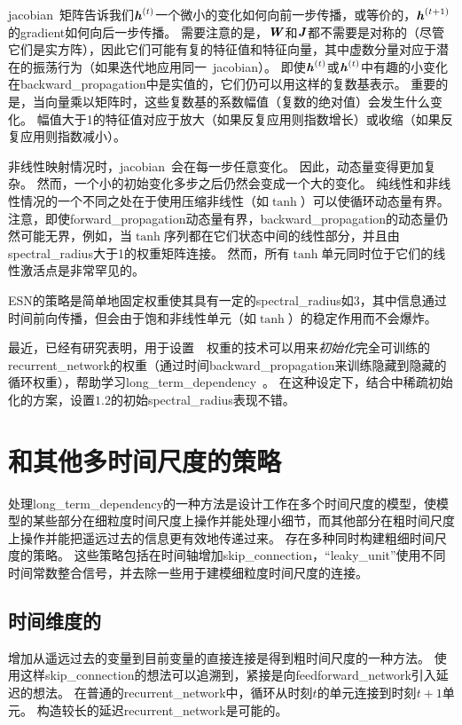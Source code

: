 \gls{jacobian}~矩阵告诉我们$\boldsymbol{\mathit{h}}^{(t)}$一个微小的变化如何向前一步传播，或等价的，$\boldsymbol{\mathit{h}}^{(t+1)}$的\gls{gradient}如何向后一步传播。
需要注意的是，$\boldsymbol{\mathit{W}}$和$\boldsymbol{\mathit{J}}$都不需要是对称的（尽管它们是实方阵），因此它们可能有复的特征值和特征向量，其中虚数分量对应于潜在的振荡行为（如果迭代地应用同一~\gls{jacobian}）。
即使$\boldsymbol{\mathit{h}}^{(t)}$或$\boldsymbol{\mathit{h}}^{(t)}$中有趣的小变化在\gls{backward_propagation}中是实值的，它们仍可以用这样的复数基表示。
重要的是，当向量乘以矩阵时，这些复数基的系数幅值（复数的绝对值）会发生什么变化。
幅值大于1的特征值对应于放大（如果反复应用则指数增长）或收缩（如果反复应用则指数减小）。

非线性映射情况时，\gls{jacobian}~会在每一步任意变化。
因此，动态量变得更加复杂。
然而，一个小的初始变化多步之后仍然会变成一个大的变化。
纯线性和非线性情况的一个不同之处在于使用压缩非线性（如$\tanh$）可以使循环动态量有界。
注意，即使\gls{forward_propagation}动态量有界，\gls{backward_propagation}的动态量仍然可能无界，例如，当$\tanh$序列都在它们状态中间的线性部分，并且由\gls{spectral_radius}大于1的权重矩阵连接。
然而，所有$\tanh$单元同时位于它们的线性激活点是非常罕见的。


\gls{ESN}的策略是简单地固定权重使其具有一定的\gls{spectral_radius}如3，其中信息通过时间前向传播，但会由于饱和非线性单元（如$\tanh$）的稳定作用而不会爆炸。

最近，已经有研究表明，用于设置~~权重的技术可以用来\emph{初始化}完全可训练的\gls{recurrent_network}的权重（通过时间\gls{backward_propagation}来训练隐藏到隐藏的循环权重），帮助学习\gls{long_term_dependency}~\citep{Sutskever-thesis2012,sutskeverimportance}。
在这种设定下，结合中稀疏初始化的方案，设置$1.2$的初始\gls{spectral_radius}表现不错。

\section{和其他多时间尺度的策略}
\label{sec:leaky_units_and_other_strategiesfor_multiple_time_scales}
处理\gls{long_term_dependency}的一种方法是设计工作在多个时间尺度的模型，使模型的某些部分在细粒度时间尺度上操作并能处理小细节，而其他部分在粗时间尺度上操作并能把遥远过去的信息更有效地传递过来。
存在多种同时构建粗细时间尺度的策略。
这些策略包括在时间轴增加\gls{skip_connection}，``\gls{leaky_unit}''使用不同时间常数整合信号，并去除一些用于建模细粒度时间尺度的连接。

\subsection{时间维度的}
\label{sec:adding_skip_connections_through_time}
增加从遥远过去的变量到目前变量的直接连接是得到粗时间尺度的一种方法。
使用这样\gls{skip_connection}的想法可以追溯到\cite{Lin-ieeetnn96}，紧接是向\gls{feedforward_network}引入延迟的想法\citep{Lang+Hinton88}。
在普通的\gls{recurrent_network}中，循环从时刻$t$的单元连接到时刻$t+1$单元。
构造较长的延迟\gls{recurrent_network}是可能的\citep{Bengio91z}。

